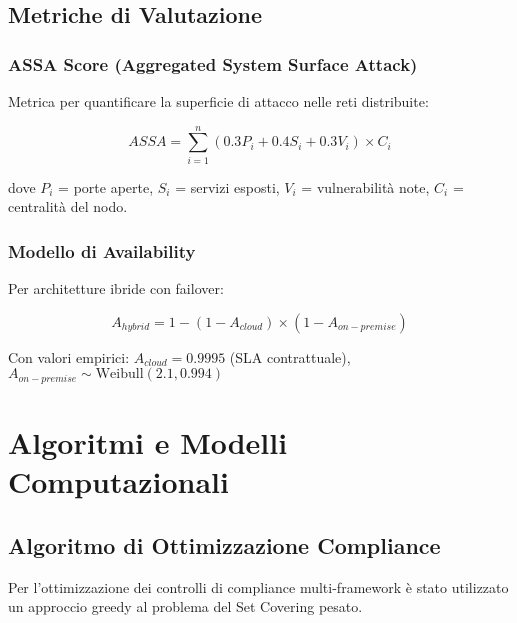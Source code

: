 \section{\texorpdfstring{Metriche di Valutazione}{A.3 - Metriche di Valutazione}}

\subsection{\texorpdfstring{ASSA Score (Aggregated System Surface Attack)}{A.3.1 - ASSA Score (Aggregated System Surface Attack)}}

Metrica per quantificare la superficie di attacco nelle reti distribuite:

\begin{equation}
ASSA = \sum_{i=1}^{n} \left(0.3 P_i + 0.4 S_i + 0.3 V_i\right) \times C_i
\end{equation}

dove $P_i$ = porte aperte, $S_i$ = servizi esposti, $V_i$ = vulnerabilità note, $C_i$ = centralità del nodo.

\subsection{\texorpdfstring{Modello di Availability}{A.3.2 - Modello di Availability}}

Per architetture ibride con failover:

\begin{equation}
A_{hybrid} = 1 - (1 - A_{cloud}) \times (1 - A_{on-premise})
\end{equation}

Con valori empirici: $A_{cloud} = 0.9995$ (SLA contrattuale), $A_{on-premise} \sim \text{Weibull}(2.1, 0.994)$

\chapter{\texorpdfstring{Algoritmi e Modelli Computazionali}{Appendice B - Algoritmi e Modelli Computazionali}}

\section{\texorpdfstring{Algoritmo di Ottimizzazione Compliance}{B.1 - Algoritmo di Ottimizzazione Compliance}}

Per l'ottimizzazione dei controlli di compliance multi-framework è stato utilizzato un approccio greedy al problema del Set Covering pesato.

